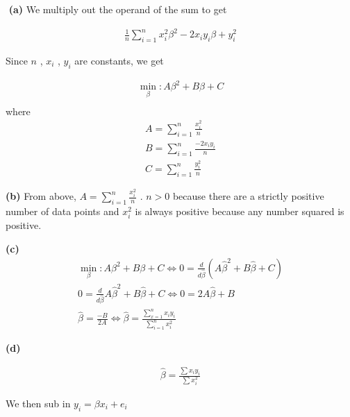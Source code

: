 \documentclass[12pt]{article}
\newenvironment{problem}[2][Problem]{\begin{trivlist}
\item[\hskip \labelsep {\bfseries #1}\hskip \labelsep {\bfseries #2.}]}{\end{trivlist}}
\newenvironment{subproblem}[1]{\textbf{(#1)}}{}
\theoremstyle{definition}
\begin{document}
\begin{problem}{2}
$ $\newline
\begin{subproblem}{a}
We multiply out the operand of the sum to get

\begin{align}
\frac{1}{n} \sum^n_{i=1} x_i^2\beta^2 - 2x_iy_i\beta + y_i^2
\end{align}

Since $ n $ , $ x_i $ , $ y_i $ are constants, we get

\begin{align*}
\min_{\beta} : A\beta^2 + B\beta + C \\
\end{align*}
where
\begin{align*}
A=\sum^n_{i=1} \frac{x_i^2}{n} \\
B=\sum^n_{i=1} \frac{-2x_iy_i}{n}\\
C=\sum^n_{i=1} \frac{y_i^2}{n}
\end{align*}
\end{subproblem}



\begin{subproblem}{b}
From above, $ \displaystyle A=\sum^n_{i=1} \frac{x_i^2}{n} $ .
$ n > 0 $ because there are a strictly positive number of data points and $ x_i^2 $ is always positive because any number squared is positive.
\end{subproblem}


\begin{subproblem}{c}
\begin{align*}
\min_{\beta} : A\beta^2 + B\beta + C  \Longleftrightarrow 0 = \frac{d}{d\hat{\beta}} (A\hat{\beta}^2 + B\hat{\beta} + C) \\
0 = \frac{d}{d\hat{\beta}} A\hat{\beta}^2 + B\hat{\beta} + C  \Longleftrightarrow 0 = 2A\hat{\beta} + B \\
\hat{\beta} = \frac{-B}{2A} \Longleftrightarrow \hat{\beta} = \frac{\sum^n_{x=1}x_iy_i}{\sum^n_{i=1}x_i^2}
\end{align*}
\end{subproblem}

\begin{subproblem}{d}

\begin{align*}
\hat{\beta} =\frac{\sum x_iy_i}{\sum{x_i^2}}
\end{align*}

We then sub in $ y_i = \beta x_i +e_i $


\end{subproblem}
\end{problem}
\end{document}
